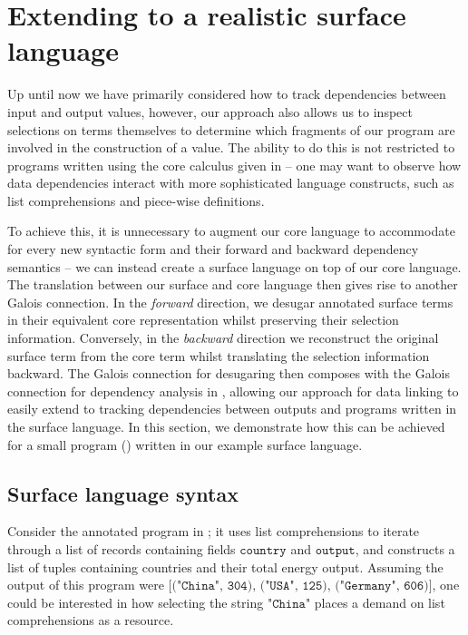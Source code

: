 \newpage
\section{Extending to a realistic surface language}
\label{sec:surface-language}

Up until now we have primarily considered how to track dependencies between input and output values, however, our approach also allows us to inspect selections on terms themselves to determine which fragments of our program are involved in the construction of a value. The ability to do this is not restricted to programs written using the core calculus given in  -- one may want to observe how data dependencies interact with more sophisticated language constructs, such as list comprehensions and piece-wise definitions.

To achieve this, it is unnecessary to augment our core language to accommodate for every new syntactic form and their forward and backward dependency semantics -- we can instead create a surface language on top of our core language. The translation between our surface and core language then gives rise to another Galois connection. In the \textit{forward} direction, we desugar annotated surface terms in their equivalent core representation whilst preserving their selection information. Conversely, in the \textit{backward} direction we reconstruct the original surface term from the core term whilst translating the selection information backward. The Galois connection for desugaring then composes with the Galois connection for dependency analysis in , allowing our approach for data linking to easily extend to tracking dependencies between outputs and programs written in the surface language. In this section, we demonstrate how this can be achieved for a small program () written in our example surface language.



\subsection{Surface language syntax}

Consider the annotated program in ; it uses list comprehensions to iterate through a list of records containing fields $\texttt{country}$ and $\texttt{output}$, and constructs a list of tuples containing countries and their total energy output. Assuming the output of this program were $\texttt{[("China", 304), ("USA", 125),}$ $\texttt{("Germany", 606)]}$, one could be interested in how selecting the string $\texttt{"China"}$ places a demand on list comprehensions as a resource.


